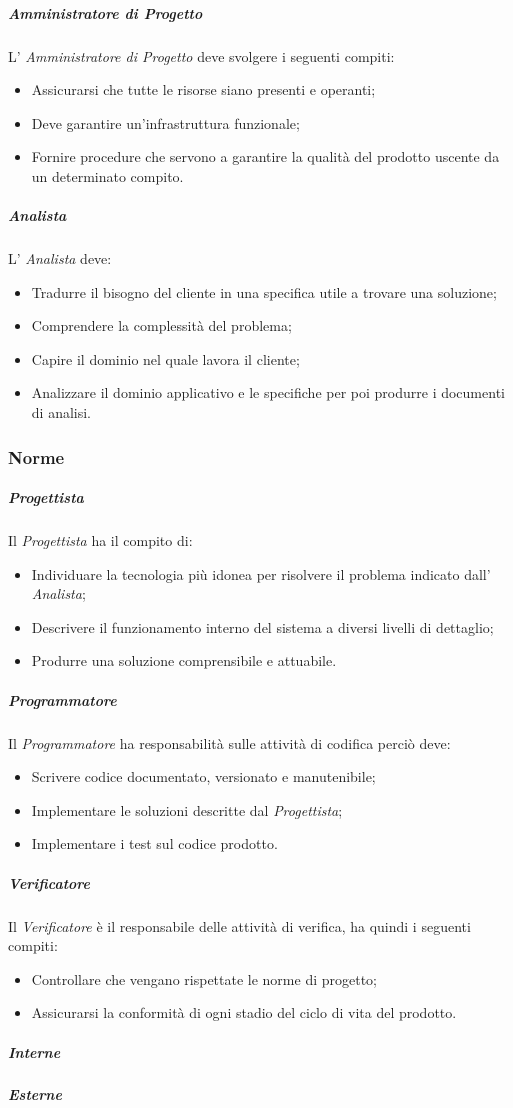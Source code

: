 \subparagraph{Amministratore di Progetto} L' \textit{Amministratore di Progetto} deve svolgere i seguenti compiti:
\begin{itemize}
\item Assicurarsi che tutte le risorse siano presenti e operanti; 
\item Deve garantire un'infrastruttura funzionale;
\item Fornire procedure che servono a garantire la qualità del prodotto uscente da un
determinato compito.
\end{itemize}

\subparagraph{Analista} L' \textit{Analista} deve:
\begin{itemize}
\item Tradurre il bisogno del cliente in una specifica utile a trovare una soluzione;
\item Comprendere la complessità del problema;
\item Capire il dominio nel quale lavora il cliente;
\item Analizzare il dominio applicativo e le specifiche per poi produrre i documenti di analisi.
\end{itemize}
\subsubsection{Norme}

\subparagraph{Progettista} Il \textit{Progettista} ha il compito di:
\begin{itemize}
\item Individuare la tecnologia più idonea per risolvere il problema indicato dall' \textit{Analista};
\item Descrivere il funzionamento interno del sistema a diversi livelli di dettaglio;
\item Produrre una soluzione comprensibile e attuabile. 
\end{itemize}

\subparagraph{Programmatore} Il \textit{Programmatore} ha responsabilità sulle attività di codifica perciò deve:
\begin{itemize}
\item Scrivere codice documentato, versionato e manutenibile;
\item Implementare le soluzioni descritte dal \textit{Progettista};
\item Implementare i test sul codice prodotto. 
\end{itemize}

\subparagraph{Verificatore} Il \textit{Verificatore} è il responsabile delle attività di verifica, ha quindi i seguenti compiti:
\begin{itemize}
\item Controllare che vengano rispettate le norme di progetto;
\item Assicurarsi la conformità di ogni stadio del ciclo di vita del prodotto.
\end{itemize}
\subparagraph{Interne}
\subparagraph{Esterne}

